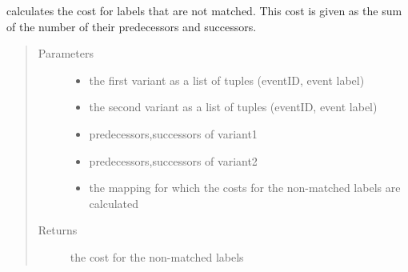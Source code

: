 \documentclass[letterpaper,10pt,english]{sphinxmanual}
\begin{document}

\begin{fulllineitems}
\label{\detokenize{cost function:costFunction.cost.costNoMatch}}
calculates the cost for labels that are not matched. This cost is given as the sum of the number of their predecessors and successors.
\begin{quote}\begin{description}
\item[{Parameters}] \leavevmode\begin{itemize}
\item {} 
 \textendash{} the first variant as a list of tuples (eventID, event label)

\item {} 
 \textendash{} the second variant as a list of tuples (eventID, event label)

\item {} 
 \textendash{} predecessors,successors of variant1

\item {} 
 \textendash{} predecessors,successors of variant2

\item {} 
 \textendash{} the mapping for which the costs for the non-matched labels are calculated

\end{itemize}

\item[{Returns}] \leavevmode
the cost for the non-matched labels

\end{description}\end{quote}

\end{fulllineitems}

\end{document}
